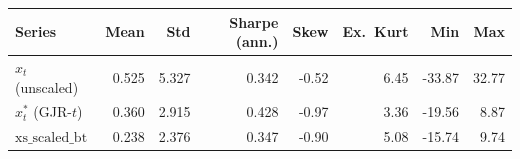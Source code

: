 \begin{tabular}{lrrrrrrr}\toprule
Series & Mean & Std & Sharpe (ann.) & Skew & Ex.\ Kurt & Min & Max \\\midrule
$x_t$ (unscaled) & 0.525 & 5.327 & 0.342 & -0.52 & 6.45 & -33.87 & 32.77 \\
$x^*_t$ (GJR-$t$) & 0.360 & 2.915 & 0.428 & -0.97 & 3.36 & -19.56 & 8.87 \\
$\text{xs\_scaled\_bt}$ & 0.238 & 2.376 & 0.347 & -0.90 & 5.08 & -15.74 & 9.74 \\
\bottomrule\end{tabular}
